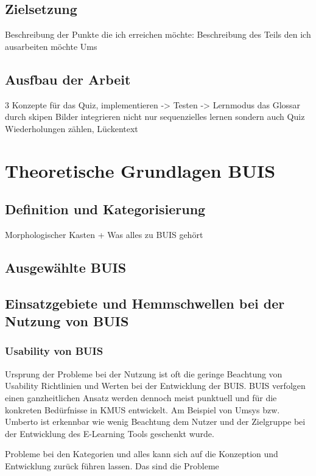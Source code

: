 \documentclass[a4paper, 12pt, twoside, BCOR=20mm, DIV=calc, abstracton, parskip=half*, toc=bibliography, toc=listof, headsepline, headings=small, numbers=enddot]{scrreprt} %
\begin{document}
\section{}
\section{Zielsetzung}
Beschreibung der Punkte die ich erreichen möchte:
Beschreibung des Teils den ich ausarbeiten möchte
Ums

\section{Ausfbau der Arbeit}
3 Konzepte für das Quiz, implementieren -> Testen ->
Lernmodus das Glossar durch skipen Bilder integrieren 
nicht nur sequenzielles lernen sondern auch  
Quiz  Wiederholungen zählen, 
Lückentext 


\chapter{Theoretische Grundlagen BUIS}
\section{Definition und Kategorisierung}
Morphologischer Kasten + Was alles zu BUIS gehört
\section{Ausgewählte BUIS}
\section{Einsatzgebiete und Hemmschwellen bei der Nutzung von BUIS}
\subsection{Usability von BUIS}
Ursprung der Probleme bei der Nutzung ist oft die geringe Beachtung von Usability Richtlinien und Werten bei der Entwicklung der BUIS. 
BUIS verfolgen einen ganzheitlichen Ansatz werden dennoch meist punktuell und für die konkreten Bedürfnisse in KMUS entwickelt. 
Am Beispiel von Umsys bzw. Umberto ist erkennbar wie wenig Beachtung dem Nutzer und der Zielgruppe bei der Entwicklung des E-Learning Tools geschenkt wurde. 

Probleme bei den Kategorien und alles kann sich auf die Konzeption und Entwicklung zurück führen lassen.
Das sind die Probleme
\end{document}
